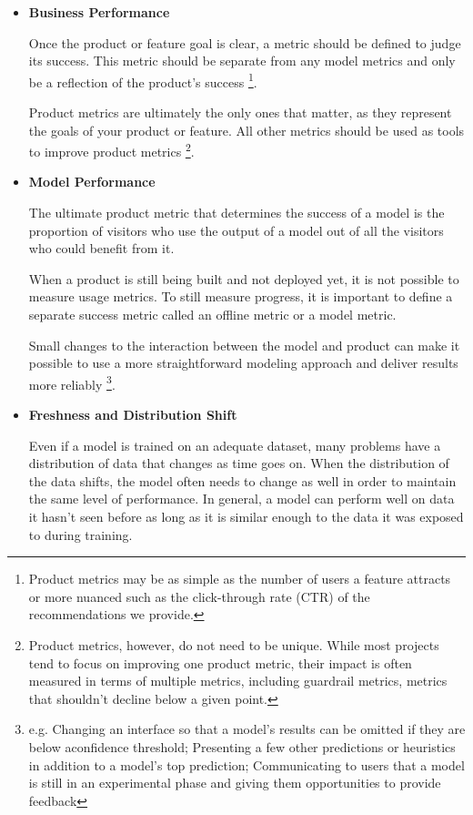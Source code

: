 \begin{itemize}
    \item \textbf{Business Performance}
    
    \noindent
    Once the product or feature goal is clear, a metric should be defined
    to judge its success. This metric should be separate from any model
    metrics and only be a reflection of the product's success
    \footnote{
        Product metrics may be as simple as the number of users a feature
        attracts or more nuanced such as the click-through rate (CTR) of
        the recommendations we provide.
    }.

    Product metrics are ultimately the only ones that matter, as they
    represent the goals of your product or feature. All other metrics
    should be used as tools to improve product metrics
    \footnote{
        Product metrics, however, do not need to be unique. While most
        projects tend to focus on improving one product metric, their
        impact is often measured in terms of multiple metrics,
        including guardrail metrics, metrics that shouldn't decline
        below a given point.
    }. 


    \item \textbf{Model Performance}
    
    \noindent
    The ultimate product metric that determines the success of a model
    is the proportion of visitors who use the output of a model out of
    all the visitors who could benefit from it.

    When a product is still being built and not deployed yet, it is not
    possible to measure usage metrics. To still measure progress, it is
    important to define a separate success metric called an offline
    metric or a model metric.

    Small changes to the interaction between the model and product can
    make it possible to use a more straightforward modeling approach
    and deliver results more reliably
    \footnote{e.g. Changing an interface so that a model's results can
    be omitted if they are below aconfidence threshold; Presenting a
    few other predictions or heuristics in addition to a model's top
    prediction; Communicating to users that a model is still in an
    experimental phase and giving them opportunities to provide feedback
    }.


    \item \textbf{Freshness and Distribution Shift}
    
    \noindent
    Even if a model is trained on an adequate dataset, many problems have
    a distribution of data that changes as time goes on. When the distribution
    of the data shifts, the model often needs to change as well in order to
    maintain the same level of performance. In general, a model can perform
    well on data it hasn't seen before as long as it is similar enough to
    the data it was exposed to during training.


\end{itemize}
